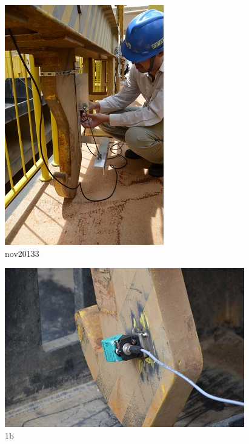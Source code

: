\begin{figure}[h!]
  \centering
  \includegraphics[width=1\linewidth]{Fotos/Novembro2014/4.jpg}
  \caption{nov20133}
  \label{nov20133}
\end{figure}

\begin{figure}[h!]
  \centering
  \includegraphics[width=1\linewidth]{Fotos/Novembro2014/6.jpg}
  \caption{1b}
  \label{nov20134}
\end{figure}

